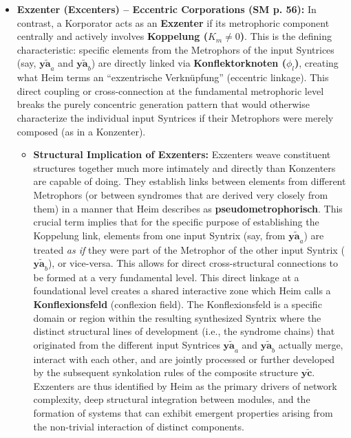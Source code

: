 \documentclass[12pt]{article}
\newcommand{\q}[1]{\enquote{#1}}
\newcommand{\syntrix}{\bm{y\widetilde{a}}}
\newcommand{\konflexivsyntrix}{\bm{y\widetilde{c}}}
\begin{document}
\begin{itemize}
    \item \textbf{Exzenter (Excenters) – Eccentric Corporations (SM p. 56):}
    In contrast, a Korporator acts as an \textbf{Exzenter} if its metrophoric component centrally and actively involves \textbf{Koppelung (\( K_m \neq 0 \))}. This is the defining characteristic: specific elements from the Metrophors of the input Syntrices (say, \( \syntrix_a \) and \( \syntrix_b \)) are directly linked via \textbf{Konflektorknoten (\( \phi_l \))}, creating what Heim terms an \q{exzentrische Verknüpfung} (eccentric linkage). This direct coupling or cross-connection at the fundamental metrophoric level breaks the purely concentric generation pattern that would otherwise characterize the individual input Syntrices if their Metrophors were merely composed (as in a Konzenter).
    \begin{itemize}
        \item \textbf{Structural Implication of Exzenters:} Exzenters weave constituent structures together much more intimately and directly than Konzenters are capable of doing. They establish links between elements from different Metrophors (or between syndromes that are derived very closely from them) in a manner that Heim describes as \textbf{pseudometrophorisch}. This crucial term implies that for the specific purpose of establishing the Koppelung link, elements from one input Syntrix (say, from \( \syntrix_a \)) are treated \textit{as if} they were part of the Metrophor of the other input Syntrix (\( \syntrix_b \)), or vice-versa. This allows for direct cross-structural connections to be formed at a very fundamental level. This direct linkage at a foundational level creates a shared interactive zone which Heim calls a \textbf{Konflexionsfeld} (conflexion field). The Konflexionsfeld is a specific domain or region within the resulting synthesized Syntrix where the distinct structural lines of development (i.e., the syndrome chains) that originated from the different input Syntrices \( \syntrix_a \) and \( \syntrix_b \) actually merge, interact with each other, and are jointly processed or further developed by the subsequent synkolation rules of the composite structure \( \konflexivsyntrix \). Exzenters are thus identified by Heim as the primary drivers of network complexity, deep structural integration between modules, and the formation of systems that can exhibit emergent properties arising from the non-trivial interaction of distinct components.

\end{itemize}
\end{itemize}
\end{document}
